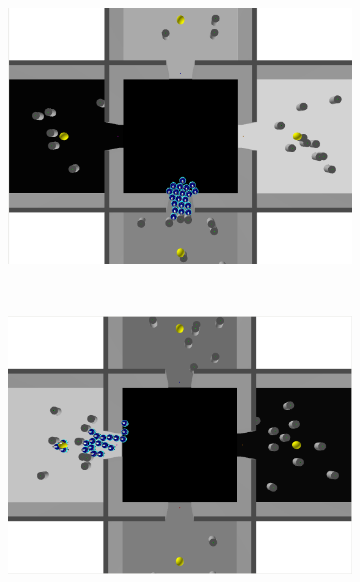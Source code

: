 \begin{figure}[h!]
        \centering
        \begin{subfigure}[b]{0.5\textwidth}
                \includegraphics[width=\textwidth]{images/blocked_entrance.png}
        \end{subfigure}%
        ~
        \begin{subfigure}[b]{0.5\textwidth}
                \includegraphics[width=\textwidth]{images/blocked_entrance1.png}
        \end{subfigure}
        \hfill
        \begin{subfigure}[b]{0.5\textwidth}

\end{subfigure}
\end{figure}
